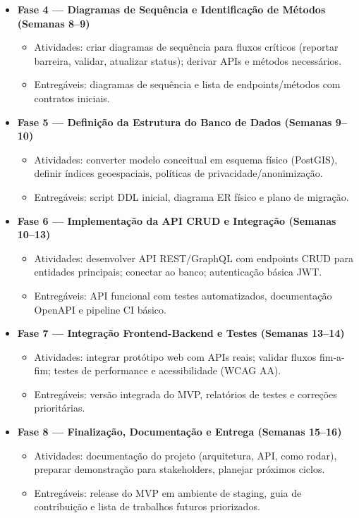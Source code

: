 \documentclass[12pt,a4paper]{article}
\begin{document}
\begin{itemize}
    \item \textbf{Fase 4 — Diagramas de Sequência e Identificação de Métodos (Semanas 8–9)}
    \begin{itemize}
        \item Atividades: criar diagramas de sequência para fluxos críticos (reportar barreira, validar, atualizar status); derivar APIs e métodos necessários.
        \item Entregáveis: diagramas de sequência e lista de endpoints/métodos com contratos iniciais.
    \end{itemize}
    
    \item \textbf{Fase 5 — Definição da Estrutura do Banco de Dados (Semanas 9–10)}
    \begin{itemize}
        \item Atividades: converter modelo conceitual em esquema físico (PostGIS), definir índices geoespaciais, políticas de privacidade/anonimização.
        \item Entregáveis: script DDL inicial, diagrama ER físico e plano de migração.
    \end{itemize}
    
    \item \textbf{Fase 6 — Implementação da API CRUD e Integração (Semanas 10–13)}
    \begin{itemize}
        \item Atividades: desenvolver API REST/GraphQL com endpoints CRUD para entidades principais; conectar ao banco; autenticação básica JWT.
        \item Entregáveis: API funcional com testes automatizados, documentação OpenAPI e pipeline CI básico.
    \end{itemize}
    
    \item \textbf{Fase 7 — Integração Frontend-Backend e Testes (Semanas 13–14)}
    \begin{itemize}
        \item Atividades: integrar protótipo web com APIs reais; validar fluxos fim-a-fim; testes de performance e acessibilidade (WCAG AA).
        \item Entregáveis: versão integrada do MVP, relatórios de testes e correções prioritárias.
    \end{itemize}
    
    \item \textbf{Fase 8 — Finalização, Documentação e Entrega (Semanas 15–16)}
    \begin{itemize}
        \item Atividades: documentação do projeto (arquitetura, API, como rodar), preparar demonstração para stakeholders, planejar próximos ciclos.
        \item Entregáveis: release do MVP em ambiente de staging, guia de contribuição e lista de trabalhos futuros priorizados.
    \end{itemize}
\end{itemize}
\end{document}
